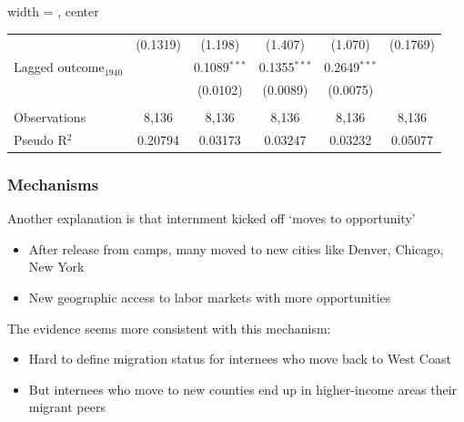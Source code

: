 \documentclass{beamer}
\begin{document}
\begin{frame}
\begin{table}[htbp]
\begin{adjustbox}{width = \textwidth, center}
\begin{tabular}{lccccc}
                                 & (0.1319)        & (1.198)         & (1.407)         & (1.070)         & (0.1769)\\   
           Lagged outcome$_{1940}$ &                 & 0.1089$^{***}$  & 0.1355$^{***}$  &  0.2649$^{***}$ &   \\   
                                 &                 & (0.0102)        & (0.0089)        &  (0.0075)       &   \\   
            \\
           Observations          & 8,136           & 8,136           & 8,136           & 8,136           & 8,136\\  
           Pseudo R$^2$          & 0.20794         & 0.03173         & 0.03247         & 0.03232         & 0.05077\\  
           \bottomrule
        \end{tabular}
     \end{adjustbox}
  \end{table}
\end{frame}

\begin{frame}
  \frametitle{Mechanisms}
  Another explanation is that internment kicked off `moves to opportunity'
  \begin{itemize}
    \item After release from camps, many moved to new cities like Denver, Chicago, New York
    \item New geographic access to labor markets with more opportunities
  \end{itemize}
  The evidence seems more consistent with this mechanism:
  \begin{itemize}
    \item Hard to define migration status for internees who move back to West Coast
    \item But internees who move to new counties end up in higher-income areas their migrant peers
  \end{itemize}
\end{frame}
\end{document}
